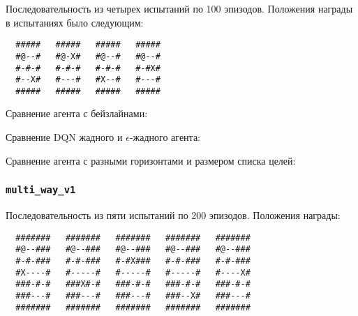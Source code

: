 \documentclass[a4paper]{article}
\begin{document}
Последовательность из четырех испытаний по 100 эпизодов. Положения награды в испытаниях было следующим:


\begin{verbatim}
  #####   #####   #####   #####
  #@--#   #@-X#   #@--#   #@--#
  #-#-#   #-#-#   #-#-#   #-#X#
  #--X#   #---#   #X--#   #---#
  #####   #####   #####   #####
\end{verbatim}

Сравнение агента с бейзлайнами:


Сравнение DQN жадного и $\epsilon$-жадного агента:


Сравнение агента с разными горизонтами и размером списка целей:

  

  

  

\subsubsection{\texttt{multi\_way\_v1}}

Последовательность из пяти испытаний по 200 эпизодов. Положения награды:

\begin{verbatim}
  #######   #######   #######   #######   #######
  #@--###   #@--###   #@--###   #@--###   #@--###
  #-#-###   #-#-###   #-#X###   #-#-###   #-#-###
  #X----#   #-----#   #-----#   #-----#   #----X#
  ###-#-#   ###X#-#   ###-#-#   ###-#-#   ###-#-#
  ###---#   ###---#   ###---#   ###--X#   ###---#
  #######   #######   #######   #######   #######
\end{verbatim}
\end{document}
